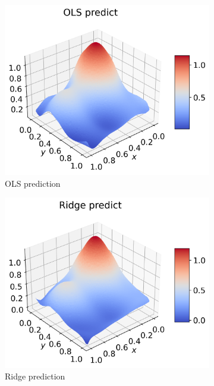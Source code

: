\documentclass[12pt]{article}
\begin{document}
\begin{figure}[H]
\begin{subfigure}{.5\textwidth}
    \centering
    \includegraphics[width=\textwidth]{../figures/ols_pred_franke_extra.png}
    \caption{OLS prediction}
    \label{fig:extra_pred_ols}
  \end{subfigure}
  \begin{subfigure}{.5\textwidth}
    \centering
    \includegraphics[width=\textwidth]{../figures/ridge_pred_franke_extra.png}
    \caption{Ridge prediction}
    \label{fig:extra_pred_ridge}
  \end{subfigure}
  \begin{subfigure}{.5\textwidth}

\end{subfigure}
\end{figure}
\end{document}
